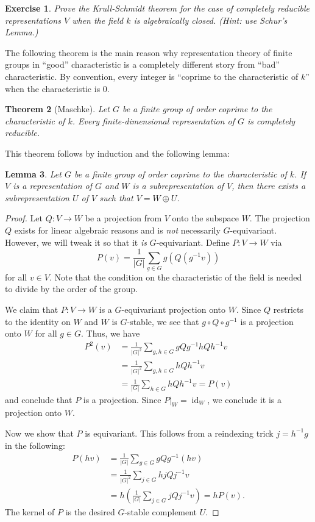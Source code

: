 \documentclass[12pt]{article}
\theoremstyle{plain}
\newtheorem{theorem}{Theorem}[section]
\newtheorem{lemma}[theorem]{Lemma}
\newtheorem{exercise}[theorem]{Exercise}
\theoremstyle{definition}
\theoremstyle{remark}
\numberwithin{equation}{section}
\begin{document}
\begin{exercise}
Prove the Krull-Schmidt theorem for the case of completely reducible
representations $V$ when the field $k$ is algebraically closed.
(Hint: use Schur's Lemma.)
\end{exercise}

The following theorem is the main reason why representation theory of finite
groups in ``good'' characteristic is a completely different story from
``bad'' characteristic.
By convention, every integer is ``coprime to the characteristic of $k$''
when the characteristic is $0$.

\begin{theorem}[Maschke]
Let $G$ be a finite group of order coprime to the characteristic of $k$.
Every finite-dimensional representation of $G$ is completely reducible.
\end{theorem}

This theorem follows by induction and the following lemma:

\begin{lemma}
Let $G$ be a finite group of order coprime to the characteristic of $k$.
If $V$ is a representation of $G$ and $W$ is a subrepresentation of $V$,
then there exists a subrepresentation $U$ of $V$
such that $V= W \oplus U$.
\end{lemma}

\begin{proof}
Let $Q: V \to W$ be a projection from $V$ onto the subspace $W$.
The projection $Q$ exists for linear algebraic reasons
and is \emph{not} necessarily $G$-equivariant.
However, we will tweak it so that it \emph{is} $G$-equivariant.
Define $P : V \to W$ via
\[
P(v) = \frac{1}{|G|} \sum_{g \in G} g\left( Q\left( g^{-1} v\right)\right)
\]
for all $v \in V$.  Note that the condition on the characteristic of the
field is needed to divide by the order of the group.

We claim that $P : V \to W$ is a $G$-equivariant projection onto $W$.
Since $Q$ restricts to the identity on $W$ and $W$ is $G$-stable,
we see that
$g \circ Q \circ g^{-1}$ is a projection onto $W$
for all $g \in G$.  Thus, we have
\begin{align*}
P^2(v) &=
\frac{1}{|G|^2} \sum_{g,h \in G} gQg^{-1} hQh^{-1}v\\
&=\frac{1}{|G|^2} \sum_{g,h \in G} hQh^{-1}v\\
&=\frac{1}{|G|} \sum_{h \in G} hQh^{-1}v = P(v)
\end{align*}
and conclude that $P$ is a projection.  Since
$P|_W=\operatorname{id}_W$, we conclude it is a projection onto $W$.

Now we show that $P$ is equivariant.
This follows from a reindexing trick $j=h^{-1}g$ in the following:
\begin{align*}
P(hv) &=
\frac{1}{|G|} \sum_{g \in G} gQg^{-1} (hv)\\
&=\frac{1}{|G|^2} \sum_{j \in G} hjQj^{-1}v\\
&=h\left(\frac{1}{|G|} \sum_{j \in G} jQj^{-1}v\right) = hP(v).
\end{align*}
The kernel of $P$ is the desired $G$-stable complement $U$.
\end{proof}
\end{document}
